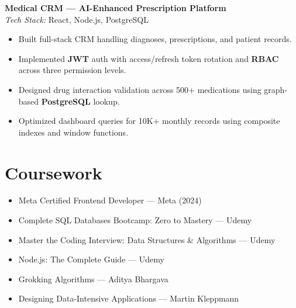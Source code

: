 \documentclass[10pt, a4paper]{article}
\begin{document}
\textbf{Medical CRM — AI-Enhanced Prescription Platform}\\
\textit{Tech Stack:} React, Node.js, PostgreSQL\\
\begin{itemize}
\item Built full-stack CRM handling diagnoses, prescriptions, and patient records.
\item Implemented \textbf{JWT} auth with access/refresh token rotation and \textbf{RBAC} across three permission levels.
\item Designed drug interaction validation across 500+ medications using graph-based \textbf{PostgreSQL} lookup.
\item Optimized dashboard queries for 10K+ monthly records using composite indexes and window functions.
\end{itemize}

\section{Coursework}
\begin{itemize}
\item Meta Certified Frontend Developer — Meta (2024)
\item Complete SQL Databases Bootcamp: Zero to Mastery — Udemy
\item Master the Coding Interview: Data Structures \& Algorithms — Udemy
\item Node.js: The Complete Guide — Udemy
\item Grokking Algorithms — Aditya Bhargava
\item Designing Data-Intensive Applications — Martin Kleppmann
\end{itemize}
\end{document}

